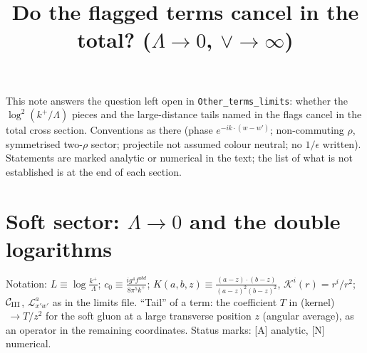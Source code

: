 \documentclass[9pt]{article}
\title{Do the flagged terms cancel in the total? ($\Lambda\to0$, $\vee\to\infty$)}
\author{}
\date{}
\numberwithin{equation}{section}
\begin{document}
\maketitle
\noindent This note answers the question left open in \texttt{Other\_terms\_limits}: whether the $\log^{2}(k^{+}/\Lambda)$ pieces and the large-distance tails named in the flags cancel in the total cross section. Conventions as there (phase $e^{-ik\cdot(w-w')}$; non-commuting $\rho$, symmetrised two-$\rho$ sector; projectile not assumed colour neutral; no $1/\epsilon$ written). Statements are marked analytic or numerical in the text; the list of what is not established is at the end of each section.

\section{Soft sector: $\Lambda\to0$ and the double logarithms}
\noindent Notation: $L\equiv\log\frac{k^{+}}{\Lambda}$; $c_{0}\equiv\frac{ig^{4}f^{abd}}{8\pi^{5}k^{+}}$; $K(a,b,z)\equiv\frac{(a-z)\cdot(b-z)}{(a-z)^{2}(b-z)^{2}}$, $\mathcal{K}^{i}(r)=r^{i}/r^{2}$; $\mathcal{C}_{\rm III}$, $\mathcal{L}^{a}_{x'w'}$ as in the limits file. ``Tail'' of a term: the coefficient $T$ in (kernel)$\,\to T/z^{2}$ for the soft gluon at a large transverse position $z$ (angular average), as an operator in the remaining coordinates. Status marks: [A] analytic, [N] numerical.
\end{document}
